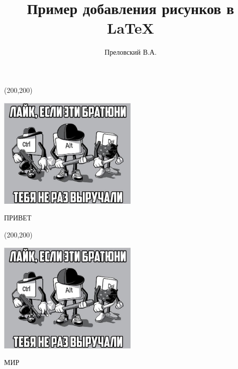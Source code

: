 \documentclass[12pt,a4paper]{article}
\author{Преловский В.А.}
\title{Пример добавления рисунков в LaTeX}
\begin{document}
	\maketitle
	\newpage
	
	\begin{picture}(200,200)
	{
		
		\includegraphics[width=0.5\textwidth]{fig}
		\centering
		\caption{ПРИВЕТ}
		\label{label}	
	}
	\end{picture}
		
	
	\begin{picture}(200,200)
	{
		
		\includegraphics[width=0.5\textwidth]{fig}
		\centering
		\caption{МИР}
		\label{label}	
	}
	\end{picture}
\end{document}
